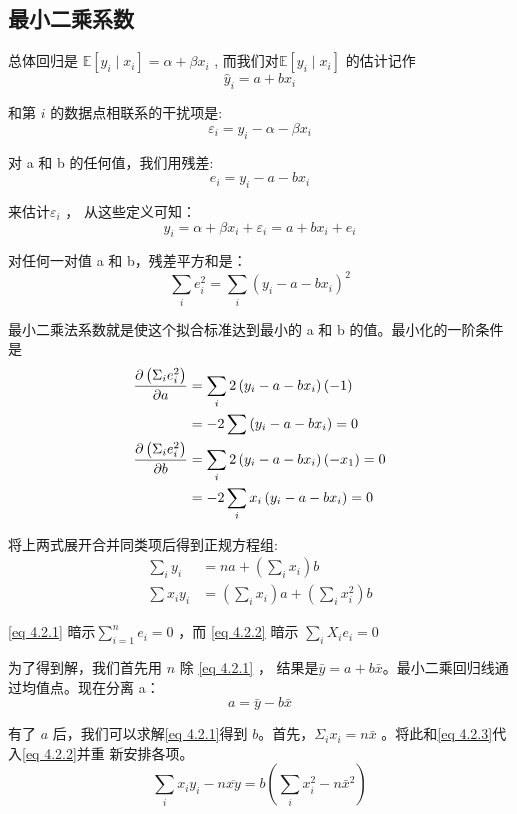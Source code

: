  \subsection{最小二乘系数}
 
 总体回归是  $\mathbb{E}\left[y_{i} \mid x_{i}\right]=\alpha+\beta x_{i}$ , 
 而我们对$ \mathbb{E}\left[y_{i} \mid x_{i}\right]$ 的估计记作
 $$ \hat{y}_{i}=a+b x_{i} $$  

 和第 $ i $ 的数据点相联系的干扰项是:
$$ \varepsilon_{i}=y_{i}-\alpha-\beta x_{i} $$

对 a 和 b 的任何值，我们用残差:
$$ e_{i}=y_{i}-a-b x_{i} $$

来估计$ \varepsilon_{i} $ ， 从这些定义可知： 
$$ y_{i}=\alpha+\beta x_{i}+\varepsilon_{i}  = a+b x_{i}+e_{i}$$

对任何一对值 a 和 b，残差平方和是：
$$ \sum_{i} e_{i}^{2}=\sum_{i}\left(y_{i}-a-b x_{i}\right)^{2} $$

最小二乘法系数就是使这个拟合标准达到最小的 a 和 b 的值。最小化的一阶条件是
\begin{align}
    \frac{\partial\left(\Sigma_{i} e_{i}^{2}\right)}{\partial a} & = \sum_{i} 2\left(y_{i}-a-b x_{i}\right)(-1) \notag  \\ 
    & = -2 \sum\left(y_{i}-a-b x_{i}\right)=0  \notag  \\
    \frac{\partial\left(\Sigma_{i} e_{i}^{2}\right)}{\partial b} &=\sum_{i} 2\left(y_{i}-a-b x_{i}\right)\left(-x_{1}\right)=0 \notag  \\
    &=-2 \sum_{i} x_{i}\left(y_{i}-a-b x_{i}\right)=0  \notag 
\end{align} 
    
将上两式展开合并同类项后得到正规方程组:
\begin{align}
    \sum_{i} y_{i} & = n a +\left(\sum_{i} x_{i}\right) b  \label{eq 4.2.1} \\
    \sum x_{i} y_{i} & = \left(\sum_{i} x_{i}\right) a+\left(\sum_{i} x_{i}^{2}\right) b \label{eq 4.2.2}
\end{align}

\eqref{eq 4.2.1} 暗示$ \sum_{i=1}^{n} e_{i}=0 $  ，而 \eqref{eq 4.2.2}  暗示 $ \sum_{i} X_{i} e_{i}=0 $

为了得到解，我们首先用 $n$ 除 \eqref{eq 4.2.1} ， 结果是$ \bar{y}=a+b \bar{x} $。最小二乘回归线通过均值点。现在分离 a：
\begin{equation}
    a=\bar{y}-b \bar{x} \label{eq 4.2.3}
\end{equation}

有了 $a$ 后，我们可以求解\eqref{eq 4.2.1}得到 $b$。首先，$\Sigma_{i} x_{i}=n \bar{x}$ 。将此和\eqref{eq 4.2.3}代入\eqref{eq 4.2.2}并重
新安排各项。
$$ \sum_{i} x_{i} y_{i}-n \overline{x y}=b\left(\sum_{i} x_{i}^{2}-n \bar{x}^{2}\right) $$

